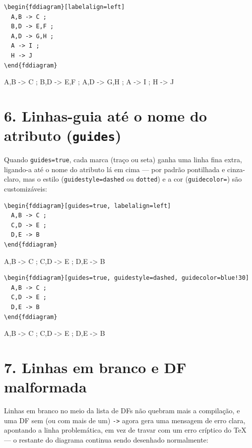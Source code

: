 \documentclass[a4paper]{article}
\begin{document}
\begin{verbatim}
\begin{fddiagram}[labelalign=left]
  A,B -> C ;
  B,D -> E,F ;
  A,D -> G,H ;
  A -> I ;
  H -> J
\end{fddiagram}
\end{verbatim}

\begin{fddiagram}[labelalign=left]
  A,B -> C ;
  B,D -> E,F ;
  A,D -> G,H ;
  A -> I ;
  H -> J
\end{fddiagram}

\section*{6. Linhas-guia até o nome do atributo (\texttt{guides})}

Quando \texttt{guides=true}, cada marca (traço ou seta) ganha uma
linha fina extra, ligando-a até o nome do atributo lá em cima ---
por padrão pontilhada e cinza-claro, mas o estilo
(\texttt{guidestyle=dashed} ou \texttt{dotted}) e a cor
(\texttt{guidecolor=}) são customizáveis:

\begin{verbatim}
\begin{fddiagram}[guides=true, labelalign=left]
  A,B -> C ;
  C,D -> E ;
  D,E -> B
\end{fddiagram}
\end{verbatim}

\begin{fddiagram}[guides=true, labelalign=left]
  A,B -> C ;
  C,D -> E ;
  D,E -> B
\end{fddiagram}

\begin{verbatim}
\begin{fddiagram}[guides=true, guidestyle=dashed, guidecolor=blue!30]
  A,B -> C ;
  C,D -> E ;
  D,E -> B
\end{fddiagram}
\end{verbatim}

\begin{fddiagram}[guides=true, guidestyle=dashed, guidecolor=blue!30]
  A,B -> C ;
  C,D -> E ;
  D,E -> B
\end{fddiagram}

\section*{7. Linhas em branco e DF malformada}

Linhas em branco no meio da lista de DFs não quebram mais a
compilação, e uma DF sem (ou com mais de um) \texttt{->} agora gera
uma mensagem de erro clara, apontando a linha problemática, em vez de
travar com um erro críptico do TeX --- o restante do diagrama continua
sendo desenhado normalmente:
\end{document}
